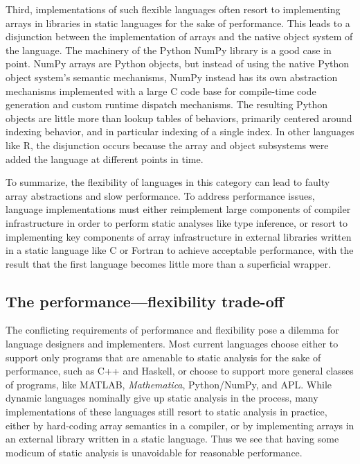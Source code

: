 \documentclass[preprint]{sigplanconf}
\newcommand{\MATLAB}{\textsc{MATLAB}}
\newcommand{\Mathematica}{\textit{Mathematica}}
\begin{document}
Third, implementations of such flexible languages often resort to implementing
arrays in libraries in static languages for the sake of performance. This
leads to a disjunction between the implementation of arrays and the native
object system of the language. The machinery of the Python NumPy library is a
good case in point. NumPy arrays are Python objects, but instead of using the
native Python object system's semantic mechanisms, NumPy instead has its own
abstraction mechanisms implemented with a large C code base for compile-time
code generation and custom runtime dispatch mechanisms. The resulting Python
objects are little more than lookup tables of behaviors, primarily centered
around indexing behavior, and in particular indexing of a single index. In
other languages like R, the disjunction occurs because the array and object
subsystems were added the language at different points in time.


To summarize, the flexibility of languages in this category can lead to faulty
array abstractions and slow performance. To address performance issues,
language implementations must either reimplement large components of compiler
infrastructure in order to perform static analyses like type inference, or
resort to implementing key components of array infrastructure in external
libraries written in a static language like C or Fortran to achieve acceptable
performance, with the result that the first language becomes little more than
a superficial wrapper.

\subsection{The performance---flexibility trade-off}

The conflicting requirements of performance and flexibility pose a dilemma for
language designers and implementers. Most current languages choose either to
support only programs that are amenable to static analysis for the sake of
performance, such as C++ and Haskell, or choose to support more general
classes of programs, like \MATLAB, \Mathematica, Python/NumPy, and APL. While
dynamic languages nominally give up static analysis in the process, many
implementations of these languages still resort to static analysis in
practice, either by hard-coding array semantics in a compiler, or by
implementing arrays in an external library written in a static language. Thus
we see that having some modicum of static analysis is unavoidable for
reasonable performance.
\end{document}
